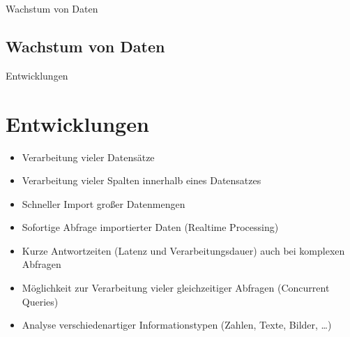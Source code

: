 \documentclass[11pt]{beamer}
\begin{document}
\begin{frame}{Wachstum von Daten}
\subsection{Wachstum von Daten}
	\begin{figure}
	\end{figure}
\end{frame}


\begin{frame}{Entwicklungen}
\section{Entwicklungen}

\end{frame}
\begin{frame}
\begin{itemize}
\item Verarbeitung vieler Datensätze
\item Verarbeitung vieler Spalten innerhalb eines Datensatzes
\item Schneller Import großer Datenmengen
\item Sofortige Abfrage importierter Daten (Realtime Processing)
\item Kurze Antwortzeiten (Latenz und Verarbeitungsdauer) auch bei komplexen Abfragen
\item Möglichkeit zur Verarbeitung vieler gleichzeitiger Abfragen (Concurrent Queries)
\item Analyse verschiedenartiger Informationstypen (Zahlen, Texte, Bilder, …)

\end{itemize}

\end{frame}
\end{document}
